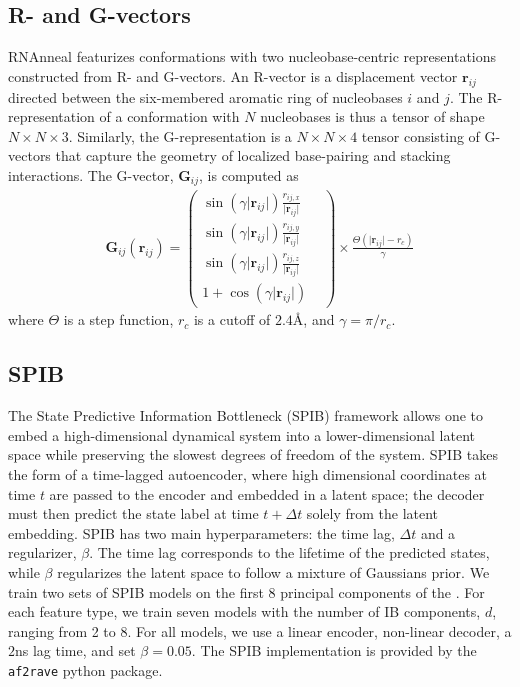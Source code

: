\documentclass[%
aip,
 amsmath,amssymb,
reprint,%
twocolumn,
]{revtex4-1}
\makeatletter
\newcommand\setcurrentname[1]{\def\@currentlabelname{#1}}
\makeatother
\begin{document}
{\subsection*{R- and G-vectors}
\setcurrentname{R- and G-vectors}
\label{methods:rna-features}
RNAnneal featurizes conformations with two nucleobase-centric representations constructed from R- and G-vectors.\cite{bottaro2014role} An R-vector is a displacement vector $\mathbf{r}_{ij}$ directed between the six-membered aromatic ring of nucleobases $i$ and $j$. The R-representation of a conformation with $N$ nucleobases is thus a tensor of shape $N \times N \times 3$. Similarly, the G-representation is a $N \times N \times 4$
tensor consisting of G-vectors that capture the geometry of localized base-pairing and stacking interactions. The G-vector, $\mathbf{G}_{ij}$, is computed as
\begin{gather}
    \mathbf{G}_{ij}(\mathbf{r}_{ij}) = 
    \begin{pmatrix}
    \sin (\gamma \lvert \mathbf{r}_{ij}\rvert)\frac{r_{ij,x}}{\lvert \mathbf{r}_{ij}\rvert} & \\
    \sin (\gamma \lvert \mathbf{r}_{ij}\rvert)\frac{r_{ij,y}}{\lvert \mathbf{r}_{ij}\rvert} & \\
    \sin (\gamma \lvert \mathbf{r}_{ij}\rvert)\frac{r_{ij,z}}{\lvert \mathbf{r}_{ij}\rvert} &  \\
    1 + \cos (\gamma \lvert \mathbf{r}_{ij}\rvert)
    \end{pmatrix}
    \times \frac{\Theta (\lvert \mathbf{r}_{ij}\rvert - r_c)}{\gamma}
\end{gather}
where $\Theta$ is a step function, $r_c$ is a cutoff of $2.4${\AA}, and $\gamma=\pi/r_c$.

\subsection*{SPIB}
\setcurrentname{SPIB}
\label{methods:spib}

The State Predictive Information Bottleneck (SPIB) framework allows one to embed a high-dimensional dynamical system into a lower-dimensional latent space while preserving the slowest degrees of freedom of the system.\cite{wang2021state} SPIB takes the form of a time-lagged autoencoder, where high dimensional coordinates at time $t$ are passed to the encoder and embedded in a latent space; the decoder must then predict the state label at time $t+\Delta t$ solely from the latent embedding. SPIB has two main hyperparameters: the time lag, $\Delta t$ and a regularizer, $\beta$. The time lag corresponds to the lifetime of the predicted states, while $\beta$ regularizes the latent space to follow a mixture of Gaussians prior. We train two sets of SPIB models on the first 8 principal components of the . For each feature type, we train seven models with the number of IB components, $d$, ranging from 2 to 8. For all models, we use a linear encoder, non-linear decoder, a $2$ns lag time, and set $\beta=0.05$. The SPIB implementation is provided by the \texttt{af2rave} python package.\cite{teng2025alphafold2} 

}
\end{document}
